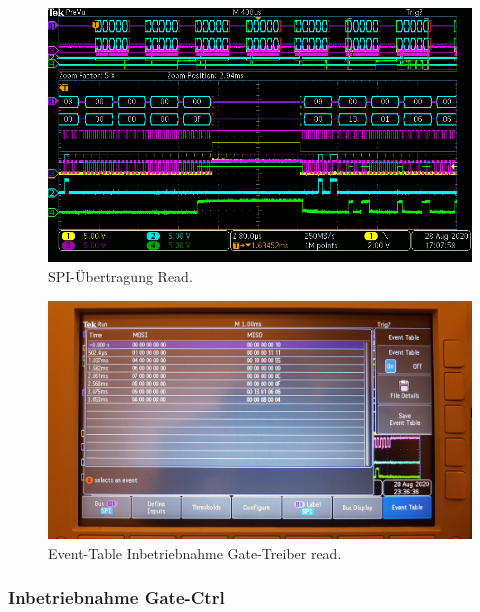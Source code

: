 \begin{figure}[H]
\center
\includegraphics[width = \textwidth]{graphics/TMC6200_Lesen}
\caption{SPI-Übertragung Read.}
\label{fig:TMC6200_Lesen}
\end{figure}
%

\begin{figure}[H]
\center
\includegraphics[width = \textwidth]{graphics/TMC6200_EventTable_Lesen_Bild}
\caption{Event-Table Inbetriebnahme Gate-Treiber read.}
\label{fig:TMC6200_EventTable_Lesen_Bild}
\end{figure}

\subsubsection{Inbetriebnahme Gate-Ctrl}\label{Appendix:TMC6200_Gate_Ctrl}

